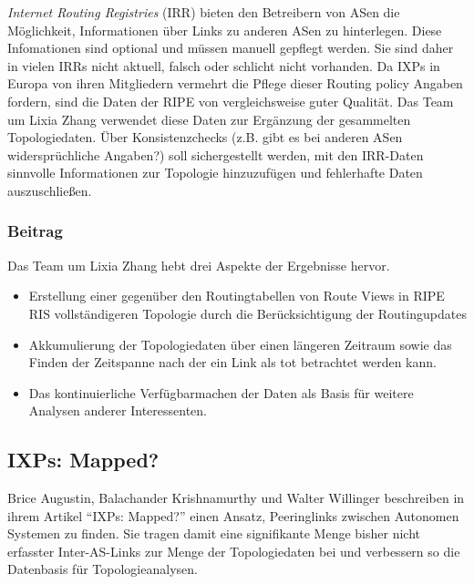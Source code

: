 \emph{Internet Routing Registries} (IRR) bieten den Betreibern von ASen die Möglichkeit, Informationen über Links zu anderen ASen zu hinterlegen.
Diese Infomationen sind optional und müssen manuell gepflegt werden.
Sie sind daher in vielen IRRs nicht aktuell, falsch oder schlicht nicht vorhanden.
Da IXPs in Europa von ihren Mitgliedern vermehrt die Pflege dieser Routing policy Angaben fordern, sind die Daten der RIPE von vergleichsweise guter Qualität.
Das Team um Lixia Zhang verwendet diese Daten zur Ergänzung der gesammelten Topologiedaten.
Über Konsistenzchecks (z.B. gibt es bei anderen ASen widersprüchliche Angaben?) soll sichergestellt werden, mit den IRR-Daten sinnvolle Informationen zur Topologie hinzuzufügen und fehlerhafte Daten auszuschließen.

\subsubsection{Beitrag}
Das Team um Lixia Zhang hebt drei Aspekte der Ergebnisse hervor.
\begin{itemize}
  \item Erstellung einer gegenüber den Routingtabellen von Route Views in RIPE RIS vollständigeren Topologie durch die Berücksichtigung der Routingupdates
  \item Akkumulierung der Topologiedaten über einen längeren Zeitraum sowie das Finden der Zeitspanne nach der ein Link als tot betrachtet werden kann.
  \item Das kontinuierliche Verfügbarmachen der Daten als Basis für weitere Analysen anderer Interessenten.
\end{itemize}

\subsection{IXPs: Mapped?~\cite{Augustin:2009:IM:1644893.1644934}}

Brice Augustin, Balachander Krishnamurthy und Walter Willinger beschreiben in ihrem Artikel "`IXPs: Mapped?"' einen Ansatz, Peeringlinks zwischen Autonomen Systemen zu finden.
Sie tragen damit eine signifikante Menge bisher nicht erfasster Inter-AS-Links zur Menge der Topologiedaten bei und verbessern so die Datenbasis für Topologieanalysen.

